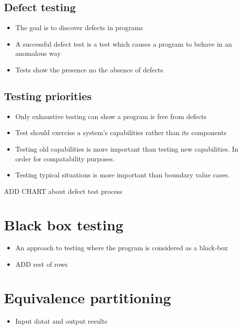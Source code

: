 \documentclass{article}
\begin{document}
\subsection{Defect testing}

\begin{itemize}
  \item The goal is to discover defects in programs
  \item A successful defect test is a test which causes a program to behave in an anomalous way
  \item Tests show the presence no the absence of defects
\end{itemize}

\subsection{Testing priorities}

\begin{itemize}
  \item Only exhaustive testing can show a program is free from defects
  \item Test should exercise a system's capabilities rather than its components
  \item Testing old capabilities is more important than testing new capabilities. In order for compatability purposes.
  \item Testing typical situations is more important than boundary value cases.
\end{itemize}

ADD CHART about defect test process

\section{Black box testing}

\begin{itemize}
  \item An approach to testing where the program is considered as a black-box
  \item ADD rest of rows
\end{itemize}

\section{Equivalence partitioning}

\begin{itemize}
  \item Input datat and output results 
\end{itemize}
\end{document}

